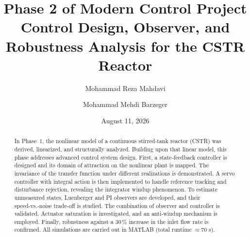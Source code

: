 \documentclass[12pt,a4paper]{article}
\title{Phase 2 of Modern Control Project \\
       Control Design, Observer, and Robustness Analysis for the CSTR Reactor}
\author{Mohammad Reza Mahdavi \and Mohammad Mehdi Barzeger}
\date{August 11, 2026}
\begin{document}
\maketitle

\begin{abstract}
In Phase~1, the nonlinear model of a continuous stirred‑tank reactor (CSTR) was derived, linearized, and structurally analyzed. Building upon that linear model, this phase addresses advanced control system design. First, a state‑feedback controller is designed and its domain of attraction on the nonlinear plant is mapped. The invariance of the transfer function under different realizations is demonstrated. A servo controller with integral action is then implemented to handle reference tracking and disturbance rejection, revealing the integrator windup phenomenon. To estimate unmeasured states, Luenberger and PI observers are developed, and their speed‑vs.‑noise trade‑off is studied. The combination of observer and controller is validated. Actuator saturation is investigated, and an anti‑windup mechanism is employed. Finally, robustness against a 30\,\% increase in the inlet flow rate is confirmed. All simulations are carried out in MATLAB (total runtime $\approx 70$ s).
\end{abstract}

\end{document}
